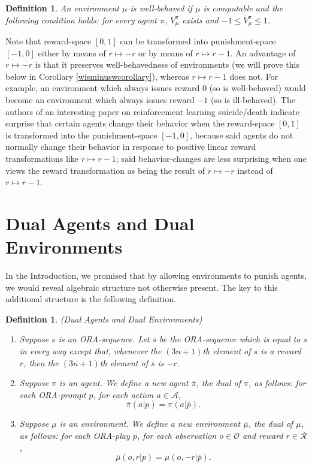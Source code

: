 \documentclass{article}
\newtheorem{definition}[theorem]{Definition}
\begin{document}
\begin{definition}
    An environment $\mu$ is \emph{well-behaved} if $\mu$ is computable and the following
    condition holds: for every agent $\pi$, $V^\pi_\mu$ exists and
    $-1\leq V^\pi_\mu\leq 1$.
\end{definition}

Note that reward-space $[0,1]$ can be transformed into punishment-space
$[-1,0]$ either by means of $r\mapsto -r$ or by means of $r\mapsto r-1$.
An advantage of $r\mapsto -r$ is that it preserves well-behavedness of
environments (we will prove this below in Corollary \ref{wisminuswcorollary}),
whereas $r\mapsto r-1$ does not. For example, an environment which always
issues reward $0$ (so is well-behaved)
would become an environment which always issues reward $-1$ (so is ill-behaved).
The authors of an interesting paper on reinforcement learning suicide/death
\cite{martin2016death} indicate surprise that certain agents change their behavior
when the reward-space $[0,1]$ is transformed into the punishment-space $[-1,0]$,
because said agents do not normally change their behavior in response to positive
linear reward transformations like $r\mapsto r-1$; said behavior-changes are
less surprising when one views the reward transformation as being the result of
$r\mapsto -r$ instead of $r\mapsto r-1$.

\section{Dual Agents and Dual Environments}
\label{dualsection}

In the Introduction, we promised that by allowing environments to punish agents,
we would reveal algebraic structure not otherwise present. The key to this additional
structure is the following definition.

\begin{definition}
(Dual Agents and Dual Environments)
\begin{enumerate}
    \item
    Suppose $s$ is an ORA-sequence. Let $\overline s$
    be the ORA-sequence which is equal to $s$ in every way except that,
    whenever the $(3n+1)$th element of $s$ is a reward $r$,
    then the $(3n+1)$th element of $\overline s$ is $-r$.
    \item
    Suppose $\pi$ is an agent.
    We define a new agent $\overline \pi$, the \emph{dual} of $\pi$,
    as follows:
    for each ORA-prompt $p$, for each action $a\in\mathcal A$,
    \[\overline\pi(a|p)=\pi(a|\overline p).\]
    \item
    Suppose $\mu$ is an environment.
    We define a new environment $\overline\mu$, the \emph{dual} of $\mu$,
    as follows:
    for each ORA-play $p$, for each observation $o\in\mathcal O$
    and reward $r\in\mathcal R$,
    \[\overline\mu(o,r|p)=\mu(o,-r|\overline p).\]
\end{enumerate}
\end{definition}
\end{document}
